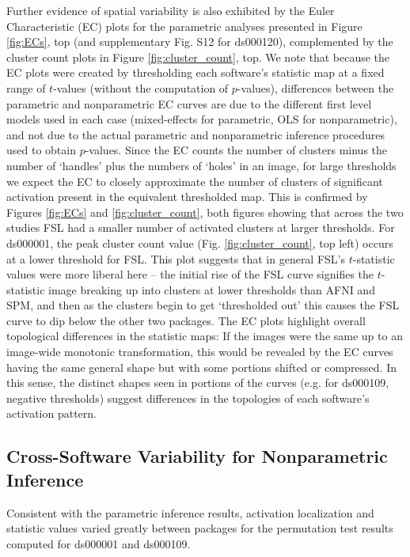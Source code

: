 Further evidence of spatial variability is also exhibited by the Euler Characteristic (EC) plots for the parametric analyses presented in Figure \ref{fig:ECs}, top (and supplementary Fig. S12 for ds000120), complemented by the cluster count plots in Figure \ref{fig:cluster_count}, top. We note that because the EC plots were created by thresholding each software's statistic map at a fixed range of $t$-values (without the computation of $p$-values), differences between the parametric and nonparametric EC curves are due to the different first level models used in each case (mixed-effects for parametric, OLS for nonparametric), and not due to the actual parametric and nonparametric inference procedures used to obtain $p$-values. Since the EC counts the number of clusters minus the number of `handles' plus the numbers of `holes' in an image, for large thresholds we expect the EC to closely approximate the number of clusters of significant activation present in the equivalent thresholded map. This is confirmed by Figures \ref{fig:ECs} and \ref{fig:cluster_count}, both figures showing that across the two studies FSL had a smaller number of activated clusters at larger thresholds. For ds000001, the peak cluster count value (Fig. \ref{fig:cluster_count}, top left) occurs at a lower threshold for FSL. This plot suggests that in general FSL's $t$-statistic values were more liberal here -- the initial rise of the FSL curve signifies the $t$-statistic image breaking up into clusters at lower thresholds than AFNI and SPM, and then as the clusters begin to get `thresholded out' this causes the FSL curve to dip below the other two packages. The EC plots highlight overall topological differences in the statistic maps: If the images were the same up to an image-wide monotonic transformation, this would be revealed by the EC curves having the same general shape but with some portions shifted or compressed. In this sense, the distinct shapes seen in portions of the curves (e.g. for ds000109, negative thresholds) suggest differences in the topologies of each software's activation pattern. 

\subsection{Cross-Software Variability for Nonparametric Inference}

Consistent with the parametric inference results, activation localization and statistic values varied greatly between packages for the permutation test results computed for ds000001 and ds000109.


